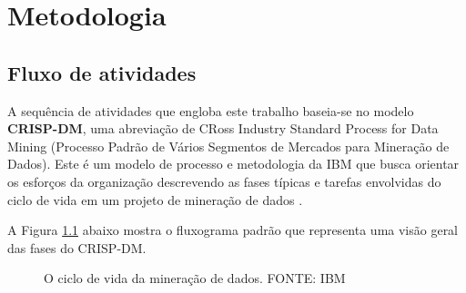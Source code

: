 \chapter{Metodologia}

\section{Fluxo de atividades}
\label{fluxo_atividades}

A sequência de atividades que engloba este trabalho baseia-se no modelo \textbf{CRISP-DM}, uma abreviação de CRoss Industry Standard Process for Data Mining (Processo Padrão de Vários Segmentos de Mercados para Mineração de Dados). Este é um modelo de processo e metodologia da IBM que busca orientar os esforços da organização descrevendo as fases típicas e tarefas envolvidas do ciclo de vida em um projeto de mineração de dados \cite{crispdm}. 

A Figura \ref{fig:crisp} abaixo mostra o fluxograma padrão que representa uma visão geral das fases do CRISP-DM.

\begin{figure}[!htb]
    \caption{\label{fig:crisp} O ciclo de vida da mineração de dados. FONTE: IBM}
\end{figure}

